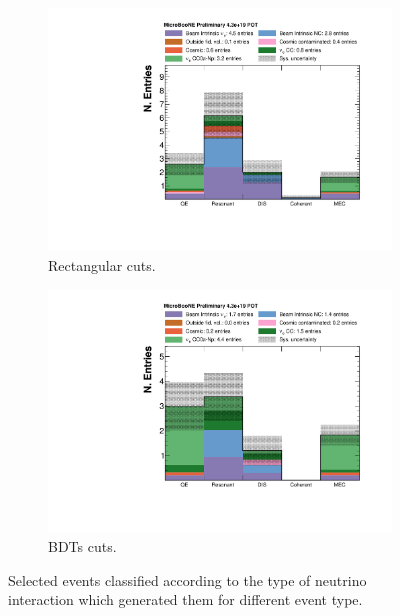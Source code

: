 \begin{figure}[htbp]
\centering
  \begin{subfigure}{0.48\textwidth}
    \includegraphics[width=\linewidth]{figures/interaction_type_cuts.pdf}
    \caption{Rectangular cuts.} 
  \end{subfigure}
    \begin{subfigure}{0.48\textwidth}
    \includegraphics[width=\linewidth]{figures/interaction_type_bdt.pdf}
    \caption{BDTs cuts.} 
  \end{subfigure}
  \caption{Selected events classified according to the type of neutrino interaction which generated them for different event type.}
  \label{fig:interaction}
\end{figure}